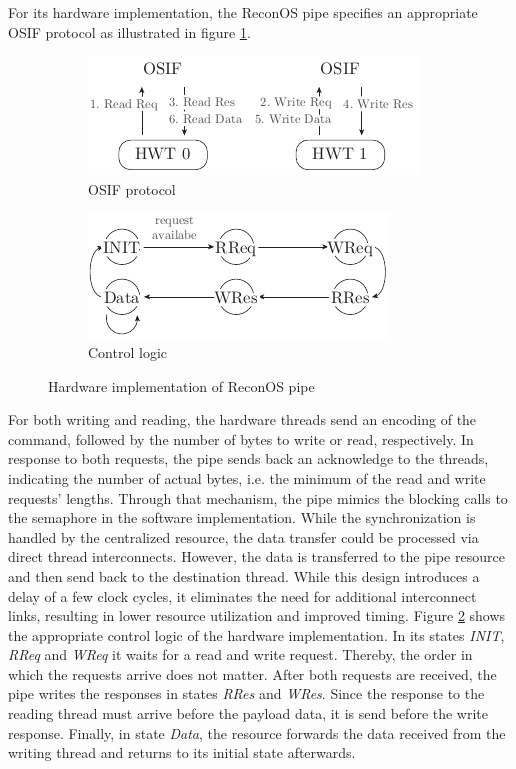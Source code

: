 For its hardware implementation, the ReconOS pipe specifies an appropriate
\ac{OSIF} protocol as illustrated in figure \ref{fig:pipe_hw_osif}.
\begin{figure}
	\centering
	\begin{subfigure}{0.49\textwidth}
		\centering
		\includegraphics{../figures/pipe_osif}
		\caption{\acs{OSIF} protocol}
		\label{fig:pipe_hw_osif}
	\end{subfigure}
	\begin{subfigure}{0.49\textwidth}
		\centering
		\includegraphics{../figures/pipe_fsm}
		\caption{Control logic}
		\label{fig:pipe_hw_fsm}
	\end{subfigure}
	\caption{Hardware implementation of ReconOS pipe}
	\label{fig:pipe_hw}
\end{figure}
For both writing and reading, the hardware threads send an encoding of the
command, followed by the number of bytes to write or read, respectively. In
response to both requests, the pipe sends back an acknowledge to the threads,
indicating the number of actual bytes, i.e. the minimum of the read and write
requests' lengths. Through that mechanism, the pipe mimics the blocking calls
to the semaphore in the software implementation. While the synchronization is
handled by the centralized resource, the data transfer could be processed via
direct thread interconnects. However, the data is transferred to the pipe
resource and then send back to the destination thread. While this design
introduces a delay of a few clock cycles, it eliminates the need for
additional interconnect links, resulting in lower resource utilization and
improved timing. Figure \ref{fig:pipe_hw_fsm} shows the appropriate control
logic of the hardware implementation. In its states \emph{INIT}, \emph{RReq}
and \emph{WReq} it waits for a read and write request. Thereby, the order in
which the requests arrive does not matter. After both requests are received,
the pipe writes the responses in states \emph{RRes} and \emph{WRes}. Since the
response to the reading thread must arrive before the payload data, it is send
before the write response. Finally, in state \emph{Data}, the resource
forwards the data received from the writing thread and returns to its initial
state afterwards.

